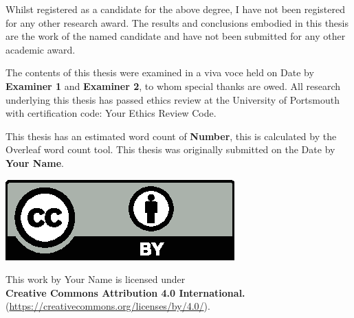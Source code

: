 Whilst registered as a candidate for the above degree, I have not been registered for any other research award. The results and conclusions embodied in this thesis are the work of the named candidate and have not been submitted for any other academic award.

\vspace{\baselineskip}
The contents of this thesis were examined in a viva voce held on Date by \textbf{Examiner 1} and \textbf{Examiner 2}, to whom special thanks are owed. All research underlying this thesis has passed ethics review at the University of Portsmouth with certification code: Your Ethics Review Code.

\vspace{\baselineskip}
This thesis has an estimated word count of \textbf{\textcolor{teal!50}{Number}}, this is calculated by the Overleaf word count tool. This thesis was originally submitted on the Date by \textbf{Your Name}.

\vspace{\baselineskip}
\vfill %
\begin{center}
    \begin{minipage}{0.35\textwidth} %
        \includegraphics[width=\textwidth]{images/preamble/by.eps}
    \end{minipage}%
    \hspace{0.02\textwidth} %
    \begin{minipage}{0.6\textwidth} %
        This work by Your Name is licensed under \\
        \textbf{Creative Commons Attribution 4.0 International.} \\
        (\href{https://creativecommons.org/licenses/by/4.0/}{https://creativecommons.org/licenses/by/4.0/}).
    \end{minipage}
\end{center}